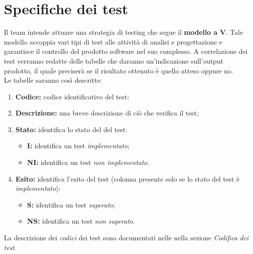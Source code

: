 \section{Specifiche dei test}
Il team intende attuare una strategia di testing che segue il \textbf{modello a V}. Tale modello accoppia vari tipi di test alle attività di analisi e progettazione e garantisce il controllo del prodotto software nel suo complesso. A correlazione dei test verranno redatte delle tabelle che daranno un'indicazione sull'output prodotto, il quale preciserà se il risultato ottenuto è quello atteso oppure no.\\
Le tabelle saranno così descritte:
\begin{enumerate}
	\item \textbf{Codice:} codice identificativo del test;
	\item \textbf{Descrizione:} una breve descrizione di ciò che verifica il test;
	\item \textbf{Stato:} identifica lo stato del del test:
	\begin{itemize}
		\item \textbf{I:} identifica un test \textit{implementato};
		\item \textbf{NI:} identifica un test \textit{non implementato}. 
	\end{itemize}
	\item \textbf{Esito:} identifica l'esito del test (colonna presente solo se lo stato del test è \textit{implementato}):
	\begin{itemize}
		\item \textbf{S:} identifica un test \textit{superato};
		\item \textbf{NS:} identifica un test \textit{non superato}. 
	\end{itemize}
\end{enumerate}
La descrizione dei \textit{codici} dei test sono documentati nelle \NdPv nella sezione \textit{Codifica dei test}.



